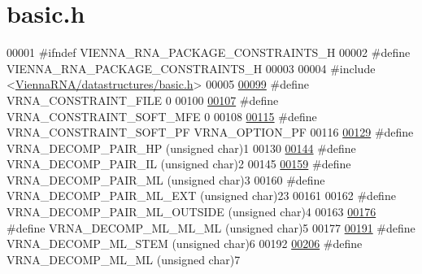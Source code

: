 \hypertarget{constraints_2basic_8h_source}{}\section{basic.\+h}
\label{constraints_2basic_8h_source}

\begin{DoxyCode}
00001 \textcolor{preprocessor}{#ifndef VIENNA\_RNA\_PACKAGE\_CONSTRAINTS\_H}
00002 \textcolor{preprocessor}{#define VIENNA\_RNA\_PACKAGE\_CONSTRAINTS\_H}
00003 
00004 \textcolor{preprocessor}{#include <\hyperlink{datastructures_2basic_8h}{ViennaRNA/datastructures/basic.h}>}
00005 
\hyperlink{group__constraints_ga62e0ed0c33002c09423de4e646f85a2b}{00099} \textcolor{preprocessor}{#define VRNA\_CONSTRAINT\_FILE      0}
00100 
\hyperlink{group__constraints_ga62aa195893d02d1a79ca94952748df36}{00107} \textcolor{preprocessor}{#define VRNA\_CONSTRAINT\_SOFT\_MFE  0}
00108 
\hyperlink{group__constraints_ga03fb5000c19b9a2082bf4ea30a543045}{00115} \textcolor{preprocessor}{#define VRNA\_CONSTRAINT\_SOFT\_PF   VRNA\_OPTION\_PF}
00116 
\hyperlink{group__constraints_ga8bd41ebc8039378d242e4e8c273716a5}{00129} \textcolor{preprocessor}{#define VRNA\_DECOMP\_PAIR\_HP     (unsigned char)1}
00130 
\hyperlink{group__constraints_gaeab04f34d7730cff2d651d782f95d857}{00144} \textcolor{preprocessor}{#define VRNA\_DECOMP\_PAIR\_IL     (unsigned char)2}
00145 
\hyperlink{group__constraints_gaa15b1185673f0b9e900c4748d45f388f}{00159} \textcolor{preprocessor}{#define VRNA\_DECOMP\_PAIR\_ML     (unsigned char)3}
00160 \textcolor{preprocessor}{#define VRNA\_DECOMP\_PAIR\_ML\_EXT     (unsigned char)23}
00161 
00162 \textcolor{preprocessor}{#define VRNA\_DECOMP\_PAIR\_ML\_OUTSIDE     (unsigned char)4}
00163 
\hyperlink{group__constraints_ga735517266f2e35e1374b8f1ea77ef23e}{00176} \textcolor{preprocessor}{#define VRNA\_DECOMP\_ML\_ML\_ML    (unsigned char)5}
00177 
\hyperlink{group__constraints_ga4a23054c75d8efc785de50e3ea87602f}{00191} \textcolor{preprocessor}{#define VRNA\_DECOMP\_ML\_STEM     (unsigned char)6}
00192 
\hyperlink{group__constraints_ga7f4cb9ff7a33e67f0539bd39e7b19a78}{00206} \textcolor{preprocessor}{#define VRNA\_DECOMP\_ML\_ML       (unsigned char)7}

\end{DoxyCode}
